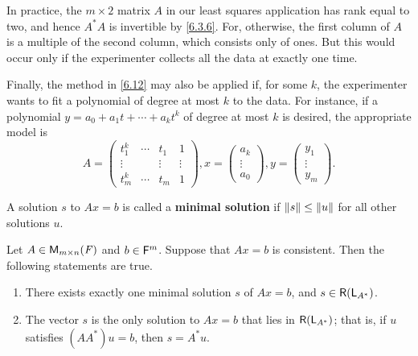 \begin{note}
  In practice, the \(m \times 2\) matrix \(A\) in our least squares application has rank equal to two, and hence \(A^* A\) is invertible by \cref{6.3.6}.
  For, otherwise, the first column of \(A\) is a multiple of the second column, which consists only of ones.
  But this would occur only if the experimenter collects all the data at exactly one time.

  Finally, the method in \cref{6.12} may also be applied if, for some \(k\), the experimenter wants to fit a polynomial of degree at most \(k\) to the data.
  For instance, if a polynomial \(y = a_0 + a_1 t + \cdots + a_k t^k\) of degree at most \(k\) is desired, the appropriate model is
  \[
    A = \begin{pmatrix}
      t_1^k  & \cdots & t_1    & 1      \\
      \vdots &        & \vdots & \vdots \\
      t_m^k  & \cdots & t_m    & 1
    \end{pmatrix}, x = \begin{pmatrix}
      a_k    \\
      \vdots \\
      a_0
    \end{pmatrix}, y = \begin{pmatrix}
      y_1    \\
      \vdots \\
      y_m
    \end{pmatrix}.
  \]
\end{note}

\begin{defn}\label{6.3.7}
  A solution \(s\) to \(Ax = b\) is called a \textbf{minimal solution} if \(\left\lVert s\right\rVert \leq \left\lVert u\right\rVert\) for all other solutions \(u\).
\end{defn}

\begin{thm}\label{6.13}
  Let \(A \in \mathsf{M}_{{m} \times n}({\mathit{F}})\) and \(b \in \mathsf{F}^m\).
  Suppose that \(Ax = b\) is consistent.
  Then the following statements are true.
  \begin{enumerate}
    \item There exists exactly one minimal solution \(s\) of \(Ax = b\), and \(s \in \rg{\L_{A^*}}\).
    \item The vector \(s\) is the only solution to \(Ax = b\) that lies in \(\rg{\L_{A^*}}\);
          that is, if \(u\) satisfies \((A A^*) u = b\), then \(s = A^* u\).
  \end{enumerate}
\end{thm}


